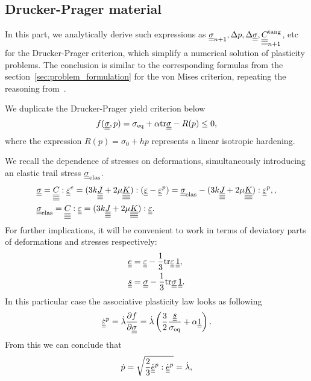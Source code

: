 \documentclass[12pt]{article}
\begin{document}
\newpage
\begin{appendices}
    \section{Drucker-Prager material}
    \label{appendix:DP}
    In this part, we analytically derive such expressions as $\uusigman, \Delta p, \Delta\uusigma, \uuuuC{}^\text{tang}_{n+1}$, etc for the Drucker-Prager criterion, which simplify a numerical solution of plasticity problems. The conclusion is similar to the corresponding formulas from the section~\ref{sec:problem_formulation} for the von Mises criterion, repeating the reasoning from~\parencite{bonnet:hal-01083772}.

    We duplicate the Drucker-Prager yield criterion below 
    \begin{equation}
        f(\uusigma, p) = \sigma_{\text{eq}} + \alpha \mtr \uusigma - R(p) \leq 0,
    \end{equation}
    where the expression $R(p) = \sigma_0 + h p $ represents a linear isotropic hardening.

    We recall the dependence of stresses on deformations, simultaneously introducing an elastic trail stress $\uusigma_\text{elas}$.
    \begin{align}
        & \uusigma = \uuuuC{} : \uueps^e = (3k\uuuuJ + 2\mu\uuuuK) : (\uueps - \uueps^p) = \uusigma_\text{elas} - (3k\uuuuJ + 2\mu\uuuuK) : \uueps^p, \label{eqn:constitutive_plastic_law}, \\
        & \uusigma_\text{elas} = \uuuuC{} : \uueps = (3k\uuuuJ + 2\mu\uuuuK) : \uueps. \label{eqn:sigma_elas}
    \end{align}
    For further implications, it will be convenient to work in terms of deviatory parts of deformations and stresses respectively:
    \begin{align*}
        & \uue = \uueps - \frac{1}{3}\mtr\uueps \, \uuUnit, \\
        & \uus = \uusigma - \frac{1}{3}\mtr\uusigma \, \uuUnit.
    \end{align*}
    In this particular case the associative plasticity law looks as following
    \begin{equation}\label{eqn:plasticity_law}
        \dot{\uueps}^p = \dot{\lambda} \frac{\partial f}{\partial \uusigma} = \dot{\lambda} \left(\frac{3}{2} \frac{\uus}{\sigma_\text{eq}} + \alpha \uuUnit \right).
    \end{equation}
    From this we can conclude that 
    \begin{equation}\label{eqn:p_lambda}
        \dot{p} = \sqrt{\frac{2}{3} \dot{\uue}^p : \dot{\uue}^p} = \dot{\lambda}, 
    \end{equation}


\end{appendices}
\end{document}

